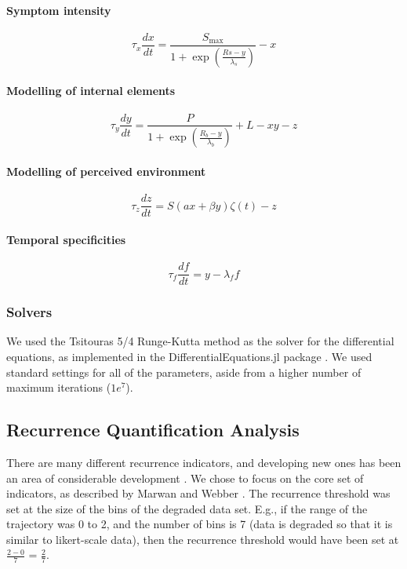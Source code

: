 \documentclass[utf8]{FrontiersinVancouver}
\begin{document}
\paragraph{Symptom intensity}
\begin{equation}
    \tau_{x}\frac{dx}{dt} = \frac{S_{\max}}{1+\exp(\frac{Rs-y}{\lambda_{s}})} - x
\end{equation}


\paragraph{Modelling of internal elements}
\begin{equation}
    \tau_{y}\frac{dy}{dt} = \frac{P}{1+\exp(\frac{R_{b}-y}{\lambda_{b}})} + L - xy - z
\end{equation}

\paragraph{Modelling of perceived environment}
\begin{equation}
    \tau_{z}\frac{dz}{dt} = S(ax + \beta y)\zeta(t) - z
\end{equation}


\paragraph{Temporal specificities}
\begin{equation}
    \tau_f\frac{df}{dt} = y - \lambda_f f
\end{equation}

\subsubsection{Solvers}
We used the Tsitouras 5/4 Runge-Kutta method as the solver for the differential equations, as implemented in the DifferentialEquations.jl package \citep{tsitourasRungeKuttaPairs2011}. We used standard settings for all of the parameters, aside from a higher number of maximum iterations ($1e^{7}$).  

\subsection{Recurrence Quantification Analysis}

There are many different recurrence indicators, and developing new ones has been an area of considerable development \citep{marwanTrendsRecurrenceAnalysis2023}. We chose to focus on the core set of indicators, as described by Marwan and Webber \citep{marwanMathematicalComputationalFoundations2015}. The recurrence threshold was set at the size of the bins of the degraded data set. E.g., if the range of the trajectory was 0 to 2, and the number of bins is 7 (data is degraded so that it is similar to likert-scale data), then the recurrence threshold would have been set at $\frac{2-0}{7}$ = $\frac{2}{7}$. 
\end{document}
